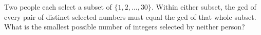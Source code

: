 Two people each select a subset of $\{1,2,\ldots,30\}$. Within either subset, the gcd of every pair of distinct selected numbers must equal the gcd of that whole subset. What is the smallest possible number of integers selected by neither person?
